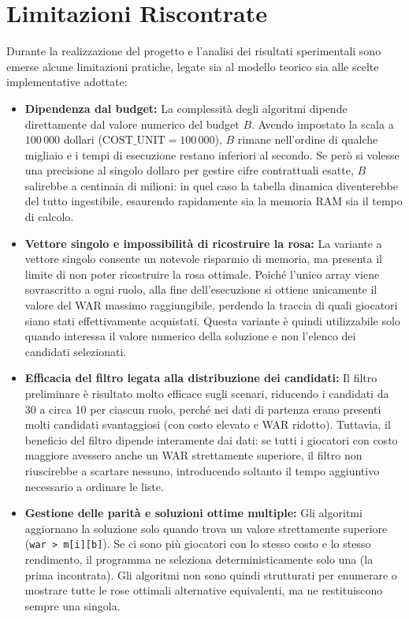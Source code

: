 \section{Limitazioni Riscontrate}
Durante la realizzazione del progetto e l'analisi dei risultati sperimentali sono emerse alcune limitazioni pratiche, legate sia al modello teorico sia alle scelte implementative adottate:

\begin{itemize}
	\item \textbf{Dipendenza dal budget:} La complessità degli algoritmi dipende direttamente dal valore numerico del budget $B$. Avendo impostato la scala a $100\,000$ dollari ($\text{COST\_UNIT} = 100\,000$), $B$ rimane nell'ordine di qualche migliaio e i tempi di esecuzione restano inferiori al secondo. Se però si volesse una precisione al singolo dollaro per gestire cifre contrattuali esatte, $B$ salirebbe a centinaia di milioni: in quel caso la tabella dinamica diventerebbe del tutto ingestibile, esaurendo rapidamente sia la memoria RAM sia il tempo di calcolo.
	
	\item \textbf{Vettore singolo e impossibilità di ricostruire la rosa:} La variante a vettore singolo consente un notevole risparmio di memoria, ma presenta il limite di non poter ricostruire la rosa ottimale. Poiché l'unico array viene sovrascritto a ogni ruolo, alla fine dell'esecuzione si ottiene unicamente il valore del WAR massimo raggiungibile, perdendo la traccia di quali giocatori siano stati effettivamente acquistati. Questa variante è quindi utilizzabile solo quando interessa il valore numerico della soluzione e non l'elenco dei candidati selezionati.
	
	\item \textbf{Efficacia del filtro legata alla distribuzione dei candidati:} Il filtro preliminare è risultato molto efficace sugli scenari, riducendo i candidati da 30 a circa 10 per ciascun ruolo, perché nei dati di partenza erano presenti molti candidati svantaggiosi (con costo elevato e WAR ridotto). Tuttavia, il beneficio del filtro dipende interamente dai dati: se tutti i giocatori con costo maggiore avessero anche un WAR strettamente superiore, il filtro non riuscirebbe a scartare nessuno, introducendo soltanto il tempo aggiuntivo necessario a ordinare le liste.
		
	\item \textbf{Gestione delle parità e soluzioni ottime multiple:} Gli algoritmi aggiornano la soluzione solo quando trova un valore strettamente superiore (\texttt{war > m[i][b]}). Se ci sono più giocatori con lo stesso costo e lo stesso rendimento, il programma ne seleziona deterministicamente solo una (la prima incontrata). Gli algoritmi non sono quindi strutturati per enumerare o mostrare tutte le rose ottimali alternative equivalenti, ma ne restituiscono sempre una singola.
\end{itemize}

